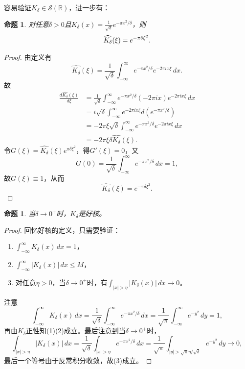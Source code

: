 \documentclass[UTF8,zihao=5,linespread=1.34]{ctexart}
\theoremstyle{cnplain}
\newtheorem{proposition}[theorem]{命题}
\theoremstyle{cnremark}
\begin{document}
容易验证$K_{\delta} \in \mathcal{S}(\mathbb{R})$，进一步有：

\begin{proposition}\label{prop:gaussian-fourier}
对任意$\delta > 0$且$K_{\delta}(x) = \frac{1}{\sqrt{\delta}} e^{-\pi x^{2}/\delta}$，则
\[
\widehat{K_{\delta}}(\xi) = e^{-\pi\delta \xi^{2}}.\qedhere
\]
\end{proposition}

\begin{proof}
由定义有
\[
\widehat{K_{\delta}}(\xi) = \frac{1}{\sqrt{\delta}} \int_{-\infty}^{\infty} e^{-\pi x^{2}/\delta} e^{-2\pi i x\xi}\,dx.
\]
故
\begin{align*}
\frac{d\widehat{K_{\delta}}(\xi)}{d\xi}
&= \frac{1}{\sqrt{\delta}} \int_{-\infty}^{\infty} e^{-\pi x^{2}/\delta} (-2\pi i x) e^{-2\pi i x\xi}\,dx \\
&= i\sqrt{\delta} \int_{-\infty}^{\infty} e^{-2\pi i x\xi} d\left(e^{-\pi x^{2}/\delta}\right) \\
&= -2\pi\xi\sqrt{\delta} \int_{-\infty}^{\infty} e^{-\pi x^{2}/\delta} e^{-2\pi i x\xi}\,dx \\
&= -2\pi\xi\delta \widehat{K_{\delta}}(\xi).
\end{align*}
令$G(\xi) = \widehat{K_{\delta}}(\xi) e^{\pi\delta \xi^{2}}$，得$G'(\xi) = 0$，又
\[
G(0) = \frac{1}{\sqrt{\delta}} \int_{-\infty}^{\infty} e^{-\pi x^{2}/\delta}\,dx = 1,
\]
故$G(\xi) \equiv 1$，从而
\[
\widehat{K_{\delta}}(\xi) = e^{-\pi\delta \xi^{2}}.
\]
\end{proof}

\begin{proposition}\label{prop:gaussian-good-kernel}
当$\delta \rightarrow 0^{+}$时，$K_{\delta}$是好核。
\end{proposition}

\begin{proof}
回忆好核的定义，只需要验证：
\begin{enumerate}
\item $\int_{-\infty}^{\infty} K_{\delta}(x)\,dx = 1$，
\item $\int_{-\infty}^{\infty} |K_{\delta}(x)|\,dx \leq M$，
\item 对任意$\eta > 0$，当$\delta \rightarrow 0^{+}$时，有$\int_{|x| > \eta} |K_{\delta}(x)|\,dx \rightarrow 0$。
\end{enumerate}
注意
\[
\int_{-\infty}^{\infty} K_{\delta}(x)\,dx = \frac{1}{\sqrt{\delta}} \int_{-\infty}^{\infty} e^{-\pi x^{2}/\delta}\,dx
= \frac{1}{\sqrt{\pi}} \int_{-\infty}^{\infty} e^{-y^{2}}\,dy = 1,
\]
再由$K_{\delta}$正性知(1)(2)成立。最后注意到当$\delta \rightarrow 0^{+}$时，
\[
\int_{|x| > \eta} |K_{\delta}(x)|\,dx = \frac{1}{\sqrt{\delta}} \int_{|x| > \eta} e^{-\pi x^{2}/\delta}\,dx
= \frac{1}{\sqrt{\pi}} \int_{|y| > \sqrt{\pi}\eta/\sqrt{\delta}} e^{-y^{2}}\,dy \rightarrow 0,
\]
最后一个等号由于反常积分收敛，故(3)成立。
\end{proof}
\end{document}
